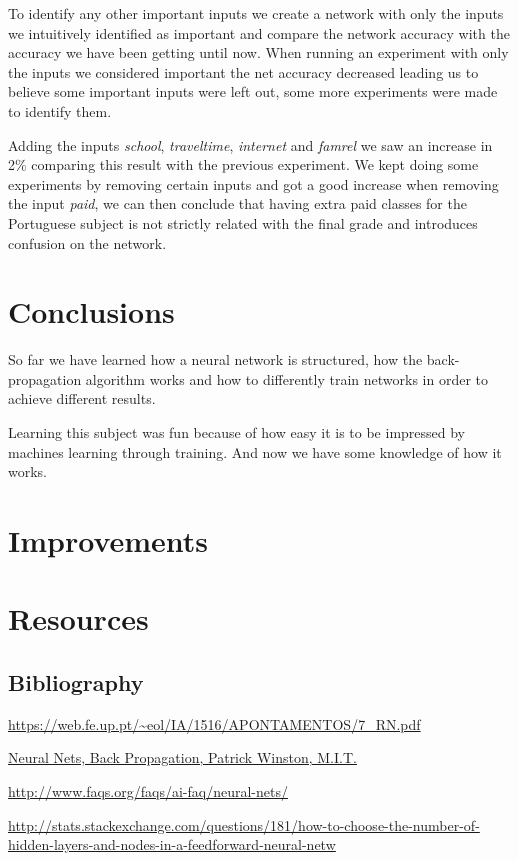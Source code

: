 \documentclass[11pt]{article}
\begin{document}
To identify any other important inputs we create a network with only the inputs we intuitively identified as important and compare the network accuracy with the accuracy we have been getting until now. When running an experiment with only the inputs we considered important the net accuracy decreased leading us to believe some important inputs were left out, some more experiments were made to identify them.

Adding the inputs \textit{school}, \textit{traveltime}, \textit{internet} and \textit{famrel} we saw an increase in 2\% comparing this result with the previous experiment.
We kept doing some experiments by removing certain inputs and got a good increase when removing the input \textit{paid}, we can then conclude that having extra paid classes for the Portuguese subject is not strictly related with the final grade and introduces confusion on the network.

\section{Conclusions}
So far we have learned how a neural network is structured, how the back-propagation algorithm works and how to differently train networks in order to achieve different results.

Learning this subject was fun because of how easy it is to be impressed by machines learning through training. And now we have some knowledge of how it works.
\section{Improvements}

\section{Resources}

\subsection{Bibliography}

\url{https://web.fe.up.pt/~eol/IA/1516/APONTAMENTOS/7_RN.pdf}

\href{https://www.youtube.com/watch?v=q0pm3BrIUFo}{Neural Nets, Back Propagation, Patrick Winston, M.I.T.}

\url{http://www.faqs.org/faqs/ai-faq/neural-nets/}

\url{http://stats.stackexchange.com/questions/181/how-to-choose-the-number-of-hidden-layers-and-nodes-in-a-feedforward-neural-netw}
\end{document}
